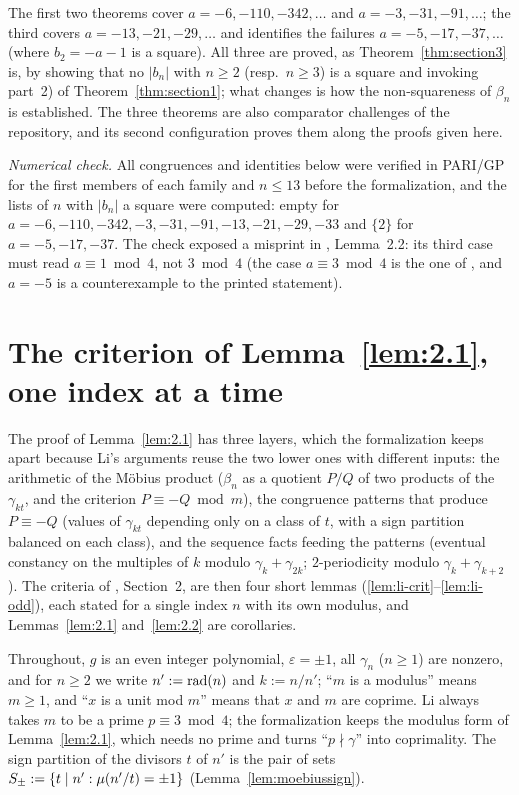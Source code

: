 The first two theorems cover $a = -6, -110, -342, \dots$ and $a = -3, -31, -91, \dots$; the third
covers $a = -13, -21, -29, \dots$ and identifies the failures $a = -5, -17, -37, \dots$ (where
$b_2 = -a - 1$ is a square). All three are proved, as Theorem~\ref{thm:section3} is, by showing
that no $|b_n|$ with $n \ge 2$ (resp.\ $n \ge 3$) is a square and invoking part~2) of
Theorem~\ref{thm:section1}; what changes is how the non-squareness of $\beta_n$ is established.
The three theorems are also comparator challenges of the repository, and its second configuration
proves them along the proofs given here.

\emph{Numerical check.} All congruences and identities below were verified in PARI/GP for the
first members of each family and $n \le 13$ before the formalization, and the lists of $n$ with
$|b_n|$ a square were computed: empty for $a = -6, -110, -342, -3, -31, -91, -13, -21, -29, -33$
and $\{2\}$ for $a = -5, -17, -37$. The check exposed a misprint in \cite{li2021}, Lemma~2.2: its
third case must read $a \equiv 1 \bmod 4$, not $3 \bmod 4$ (the case $a \equiv 3 \bmod 4$ is the
one of \cite{li2020}, and $a = -5$ is a counterexample to the printed statement).

\section{\texorpdfstring{The criterion of Lemma~\ref{lem:2.1}, one index at a time}{The criterion of
  Lemma II.2.1, one index at a time}}

The proof of Lemma~\ref{lem:2.1} has three layers, which the formalization keeps apart because
Li's arguments reuse the two lower ones with different inputs: the arithmetic of the Möbius
product ($\beta_n$ as a quotient $P/Q$ of two products of the $\gamma_{kt}$, and the criterion
$P \equiv -Q \bmod m$), the congruence patterns that produce $P \equiv -Q$ (values of
$\gamma_{kt}$ depending only on a class of $t$, with a sign partition balanced on each class),
and the sequence facts feeding the patterns (eventual constancy on the multiples of $k$ modulo
$\gamma_k + \gamma_{2k}$; $2$-periodicity modulo $\gamma_k + \gamma_{k+2}$). The criteria of
\cite{li2021}, Section~2, are then four short lemmas (\ref{lem:li-crit}--\ref{lem:li-odd}), each
stated for a single index $n$ with its own modulus, and Lemmas~\ref{lem:2.1} and~\ref{lem:2.2}
are corollaries.

Throughout, $g$ is an even integer polynomial, $\varepsilon = \pm 1$, all $\gamma_n$ ($n \ge 1$)
are nonzero, and for $n \ge 2$ we write $n' := \operatorname{rad}(n)$ and $k := n/n'$; ``$m$ is a modulus''
means $m \ge 1$, and ``$x$ is a unit mod $m$'' means that $x$ and $m$ are coprime. Li always
takes $m$ to be a prime $p \equiv 3 \bmod 4$; the formalization keeps the modulus form of
Lemma~\ref{lem:2.1}, which needs no prime and turns ``$p \nmid \gamma$'' into coprimality. The
sign partition of the divisors $t$ of $n'$ is the pair of sets
$S_\pm := \{t \mathrel{\mid} n' : \mu(n'/t) = \pm 1\}$ (Lemma~\ref{lem:moebiussign}).

